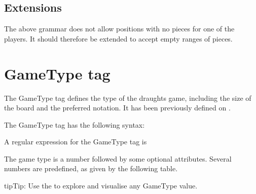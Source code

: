 \documentclass[letterpaper,10pt,english]{sphinxmanual}
\begin{document}
\section{Extensions}
\label{\detokenize{fen:extensions}}
\sphinxAtStartPar
The above grammar does not allow positions with no pieces for one of the
players. It should therefore be extended to accept empty ranges of pieces.

\sphinxstepscope


\chapter{GameType tag}
\label{\detokenize{gametype:gametype-tag}}\label{\detokenize{gametype:gametype-section}}\label{\detokenize{gametype::doc}}
\sphinxAtStartPar
The GameType tag defines the type of the draughts game, including the size of the board
and the preferred notation. It has been previously defined on .

\sphinxAtStartPar
The GameType tag has the following syntax:

\sphinxAtStartPar
{}

\sphinxAtStartPar
A regular expression for the GameType tag is

\begin{sphinxVerbatim}[commandchars=\\\{\}]
\end{sphinxVerbatim}

\sphinxAtStartPar
The game type is a number followed by some optional attributes. Several numbers are
predefined, as given by the following table.

\begin{sphinxadmonition}{tip}{Tip:}
\sphinxAtStartPar
Use the  to
explore and visualise any GameType value.
\end{sphinxadmonition}
\end{document}
